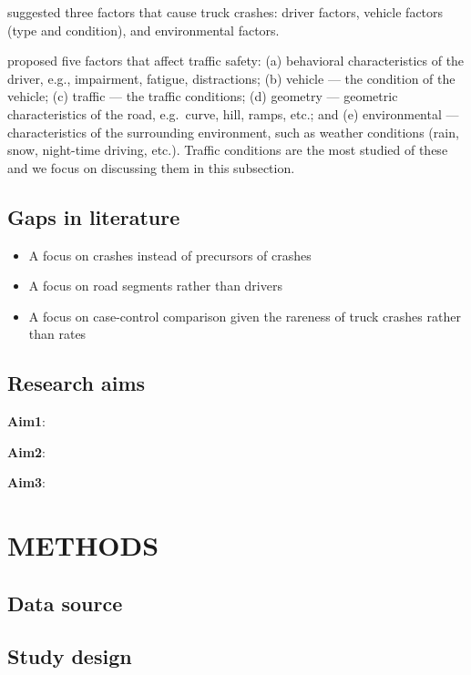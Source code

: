 \documentclass[12pt]{book}
\numberwithin{equation}{chapter}
\providecommand{\tightlist}{%
  \setlength{\itemsep}{0pt}\setlength{\parskip}{0pt}}
\begin{document}
\citet{cantor2010driver} suggested three factors that cause truck crashes: driver factors, vehicle factors (type and condition), and environmental factors.

\citet{roshandel2015impact} proposed five factors that affect traffic safety: (a) behavioral characteristics of the driver, e.g., impairment, fatigue, distractions; (b) vehicle --- the condition of the vehicle; (c) traffic --- the traffic conditions; (d) geometry --- geometric characteristics of the road, e.g.~curve, hill, ramps, etc.; and (e) environmental --- characteristics of the surrounding environment, such as weather conditions (rain, snow, night-time driving, etc.). Traffic conditions are the most studied of these and we focus on discussing them in this subsection.

\hypertarget{gaps-in-literature}{%
\section{Gaps in literature}\label{gaps-in-literature}}

\begin{itemize}
\tightlist
\item
  A focus on crashes instead of precursors of crashes
\item
  A focus on road segments rather than drivers
\item
  A focus on case-control comparison given the rareness of truck crashes rather than rates
\end{itemize}

\hypertarget{research-aims}{%
\section{Research aims}\label{research-aims}}

\textbf{Aim1}:

\textbf{Aim2}:

\textbf{Aim3}:

\hypertarget{methods}{%
\chapter{METHODS}\label{methods}}

\hypertarget{data-source}{%
\section{Data source}\label{data-source}}

\hypertarget{study-design}{%
\section{Study design}\label{study-design}}
\end{document}
